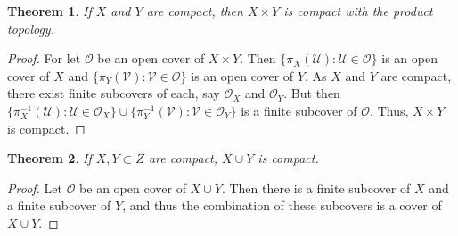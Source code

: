 \documentclass[crop=false,class=book]{standalone}
\theoremstyle{mystyle}
\newtheorem{theorem}{Theorem}[section]
\begin{document}
\begin{theorem}
If $X$ and $Y$ are compact, then $X\times Y$ is compact with the product topology.
\end{theorem}
\begin{proof}
For let $\mathscr{O}$ be an open cover of $X\times Y$. Then $\{\pi_X(\mathscr{U}):\mathscr{U}\in \mathscr{O}\}$ is an open cover of $X$ and $\{\pi_{Y}(\mathscr{V}):\mathscr{V}\in \mathscr{O}\}$ is an open cover of $Y$. As $X$ and $Y$ are compact, there exist finite subcovers of each, say $\mathcal{O}_X$ and $\mathcal{O}_Y$. But then $\{\pi_{X}^{-1}(\mathcal{U}):\mathcal{U}\in \mathcal{O}_X\}\cup \{\pi_{Y}^{-1}(\mathcal{V}):\mathcal{V}\in \mathcal{O}_Y\}$ is a finite subcover of $\mathscr{O}$. Thus, $X\times Y$ is compact.
\end{proof}
\begin{theorem}
If $X,Y\subset Z$ are compact, $X\cup Y$ is compact.
\end{theorem}
\begin{proof}
Let $\mathcal{O}$ be an open cover of $X\cup Y$. Then there is a finite subcover of $X$ and a finite subcover of $Y$, and thus the combination of these subcovers is a cover of $X\cup Y$.
\end{proof}
\end{document}
